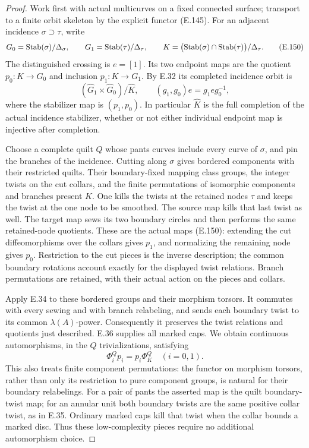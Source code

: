 \begin{proof}
Work first with actual multicurves on a fixed connected surface;
transport to a finite orbit skeleton by the explicit functor
(E.145).  For an adjacent incidence $\sigma\supset\tau$, write
\[
 G_0=\operatorname{Stab}(\sigma)/\Delta_\sigma,\qquad
 G_1=\operatorname{Stab}(\tau)/\Delta_\tau,\qquad
 K=\bigl(\operatorname{Stab}(\sigma)\cap\operatorname{Stab}(\tau)\bigr)/\Delta_\tau.
                                                               \tag{E.150}
\]
The distinguished crossing is $e=[1]$.  Its two endpoint maps
are the quotient $p_0:K\to G_0$ and inclusion $p_1:K\to G_1$.
By E.32 its completed incidence orbit is
\[
  (\widehat G_1\times\widehat G_0)/\widehat K,
  \qquad (g_1,g_0)e=g_1 e g_0^{-1},                            \tag{E.151}
\]
where the stabilizer map is $(p_1,p_0)$.  In particular
$\widehat K$ is the full completion of the actual incidence
stabilizer, whether or not either individual endpoint map is
injective after completion.

Choose a complete quilt $Q$ whose pants curves include every
curve of $\sigma$, and pin the branches of the incidence.
Cutting along $\sigma$ gives bordered components with their
restricted quilts.  Their boundary-fixed mapping class groups,
the integer twists on the cut collars, and the finite permutations
of isomorphic components and branches present $K$.  One kills
the twists at the retained nodes $\tau$ and keeps the twist at
the one node to be smoothed.  The source map kills that last
twist as well.  The target map sews its two boundary circles
and then performs the same retained-node quotients.  These are
the actual maps (E.150): extending the cut diffeomorphisms over
the collars gives $p_1$, and normalizing the remaining node gives
$p_0$.  Restriction to the cut pieces is the inverse description;
the common boundary rotations account exactly for the displayed
twist relations.  Branch permutations are retained, with their
actual action on the pieces and collars.

Apply E.34 to these bordered groups and their morphism torsors.
It commutes with every sewing and with branch relabeling, and
sends each boundary twist to its common $\lambda(A)$-power.
Consequently it preserves the twist relations and quotients just
described.  E.36 supplies all marked caps.  We obtain continuous
automorphisms, in the $Q$ trivializations, satisfying
\[
 \Phi_i^Q p_i=p_i\Phi_K^Q\quad(i=0,1).                      \tag{E.152}
\]
This also treats finite component permutations: the functor on
morphism torsors, rather than only its restriction to pure
component groups, is natural for their boundary relabelings.
For a pair of pants the asserted map is the quilt boundary-twist
map; for an annular unit both boundary twists are the same
positive collar twist, as in E.35.  Ordinary marked caps kill
that twist when the collar bounds a marked disc.  Thus these
low-complexity pieces require no additional automorphism choice.


\end{proof}
